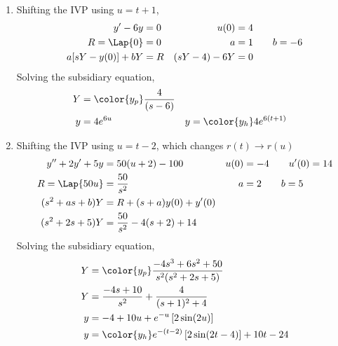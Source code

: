 \begin{enumerate}
    \item Shifting the IVP using $ u = t+1 $,
          \begin{align}
              y' - 6y           & = 0               &
              u(0)              & = 4                 \\
              R = \Lap\{0\}     & = 0               &
              a                 & = 1 \qquad b = -6   \\
              a[sY - y(0)] + bY & = R               &
              (sY - 4) - 6Y     & = 0
          \end{align}
          Solving the subsidiary equation,
          \begin{align}
              Y & = \color{y_p}\frac{4}{(s - 6)}   \\
              y & =  4e^{6u}                     &
              y & = \color{y_h} 4e^{6(t+1)}
          \end{align}


    \item Shifting the IVP using $ u = t-2 $, which changes $ r(t) \rightarrow r(u) $
          \begin{align}
              y'' + 2y' + 5y  & = 50(u+2) - 100                &
              u(0)            & = -4 \qquad u'(0) = 14           \\
              R = \Lap\{50u\} & = \frac{50}{s^2}               &
              a               & = 2 \qquad b = 5                 \\
              (s^2 + as + b)Y & = R + (s+a)y(0) + y'(0)          \\
              (s^2 + 2s + 5)Y & = \frac{50}{s^2} - 4(s+2) + 14
          \end{align}
          Solving the subsidiary equation,
          \begin{align}
              Y & = \color{y_p}\frac{-4s^3 + 6s^2 + 50}
              {s^2 (s^2 + 2s + 5)}                                   \\
              Y & = \frac{-4s + 10}{s^2}
              + \frac{4}{(s+1)^2 + 4}                                \\
              y & = -4 + 10u + e^{-u}\left[ 2\sin(2u) \right]        \\
              y & = \color{y_h} e^{-(t-2)}\left[ 2\sin(2t-4) \right]
              + 10t - 24
          \end{align}


\end{enumerate}
